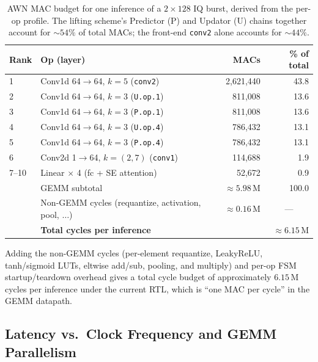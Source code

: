 \begin{table}[!ht]
\caption{AWN MAC budget for one inference of a $2 \times 128$ IQ burst,
  derived from the per-op profile. The lifting scheme's Predictor (P) and
  Updator (U) chains together account for $\sim 54\%$ of total MACs; the
  front-end \texttt{conv2} alone accounts for $\sim 44\%$.}
\label{tab:fpga_macs}
\centering
\small
\begin{tabular}{llrr}
\toprule
Rank & Op (layer)                              & MACs       & \% of total \\
\midrule
1    & Conv1d 64$\to$64, $k=5$ (\texttt{conv2})   & 2{,}621{,}440 & 43.8 \\
2    & Conv1d 64$\to$64, $k=3$ (\texttt{U.op.1}) &   811{,}008 & 13.6 \\
3    & Conv1d 64$\to$64, $k=3$ (\texttt{P.op.1}) &   811{,}008 & 13.6 \\
4    & Conv1d 64$\to$64, $k=3$ (\texttt{U.op.4}) &   786{,}432 & 13.1 \\
5    & Conv1d 64$\to$64, $k=3$ (\texttt{P.op.4}) &   786{,}432 & 13.1 \\
6    & Conv2d 1$\to$64, $k = (2,7)$ (\texttt{conv1}) & 114{,}688 & 1.9 \\
7--10 & Linear $\times$ 4 (fc + SE attention)   &    52{,}672 & 0.9 \\
\midrule
     & GEMM subtotal                           & $\approx 5.98\,\text{M}$ & 100.0 \\
     & Non-GEMM cycles (requantize, activation, pool, $\ldots$) & $\approx 0.16\,\text{M}$ & \multicolumn{1}{c}{---} \\
\midrule
     & \textbf{Total cycles per inference}     & \multicolumn{2}{r}{$\approx 6.15\,\text{M}$} \\
\bottomrule
\end{tabular}
\end{table}

Adding the non-GEMM cycles (per-element requantize, LeakyReLU, tanh/sigmoid
LUTs, eltwise add/sub, pooling, and multiply) and per-op FSM
startup/teardown overhead gives a total cycle budget of approximately
$6.15\,\text{M}$ cycles per inference under the current RTL, which is
``one MAC per cycle'' in the GEMM datapath.

\subsection{Latency vs.\ Clock Frequency and GEMM Parallelism}

